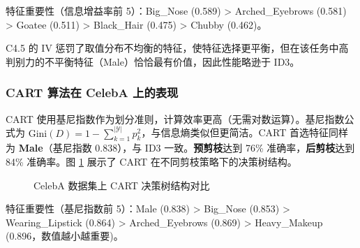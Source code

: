 \documentclass[UTF8]{ctexart}
\begin{document}
\noindent 特征重要性（信息增益率前 5）：Big\_Nose (0.589) > Arched\_Eyebrows (0.581) > Goatee (0.511) > Black\_Hair (0.475) > Chubby (0.462)。

\noindent C4.5 的 IV 惩罚了取值分布不均衡的特征，使特征选择更平衡，但在该任务中高判别力的不平衡特征（Male）恰恰最有价值，因此性能略逊于 ID3。

\subsubsection{CART 算法在 CelebA 上的表现}

CART 使用基尼指数作为划分准则，计算效率更高（无需对数运算）。基尼指数公式为 $\text{Gini}(D) = 1 - \sum_{k=1}^{|\mathcal{Y}|}p_k^2$，与信息熵类似但更简洁。CART 首选特征同样为 \textbf{Male}（基尼指数 0.838），与 ID3 一致。\textbf{预剪枝}达到 76\% 准确率，\textbf{后剪枝}达到 84\% 准确率。图 \ref{fig:celeba_cart} 展示了 CART 在不同剪枝策略下的决策树结构。

\begin{figure}[H]
    \centering
    \hfill
    \caption{CelebA 数据集上 CART 决策树结构对比}
    \label{fig:celeba_cart}
\end{figure}

\noindent 特征重要性（基尼指数前 5）：Male (0.838) > Big\_Nose (0.853) > Wearing\_Lipstick (0.864) > Arched\_Eyebrows (0.869) > Heavy\_Makeup (0.896，数值越小越重要)。
\end{document}
